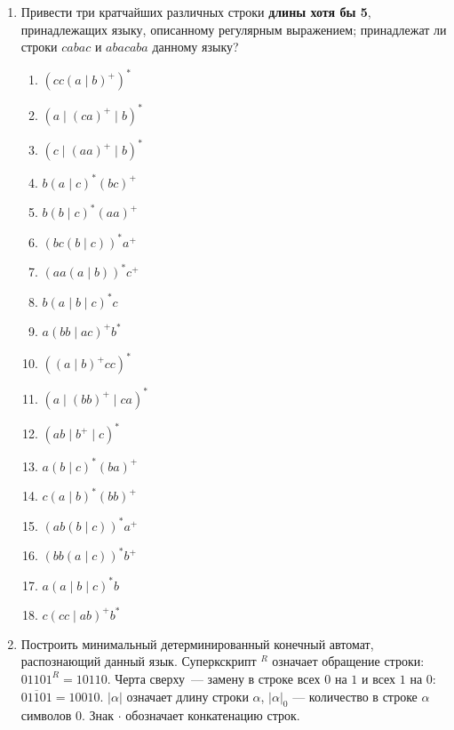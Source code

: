 \documentclass[12pt]{article}
\begin{document}
\newpage

\begin{enumerate}
\setlength\itemsep{1em}

  \item Привести три кратчайших различных строки \textbf{длины хотя бы 5}, принадлежащих языку, описанному регулярным выражением; принадлежат ли строки $cabac$ и $abacaba$ данному языку?

  \begin{enumerate}[label=\arabic*)]
    \setlength\itemsep{0.8em}
    \setcounter{enumii}{3}
    \item $(c c (a \mid b)^+)^*$
    \item $(a \mid (ca)^+ \mid b)^*$
    \item $(c \mid (aa)^+ \mid b)^*$
    \item $b (a \mid c)^* (bc)^+$
    \item $b (b \mid c)^* (aa)^+$
    \item $(bc (b \mid c))^* a^+$
    \item $(aa (a \mid b))^* c^+$
    \item $b (a \mid b \mid c)^* c$
    \item $a (bb \mid ac)^+ b^*$
    \item $((a \mid b)^+ c c)^*$
    \item $(a \mid (bb)^+ \mid ca)^*$
    \item $(ab \mid b^+ \mid c)^*$
    \item $a (b \mid c)^* (ba)^+$
    \item $c (a \mid b)^* (bb)^+$
    \item $(ab (b \mid c))^* a^+$
    \item $(bb (a \mid c))^* b^+$
    \item $a (a \mid b \mid c)^* b$
    \item $c (cc \mid ab)^+ b^*$
  \end{enumerate}

  \item Построить минимальный детерминированный конечный автомат, распознающий данный язык. Суперкскрипт $^R$ означает обращение строки: $01101^R = 10110$. Черта сверху~--- замену в строке всех $0$ на $1$ и всех $1$ на $0$: $\overline{01101} = 10010$. $|\alpha|$ означает длину строки $\alpha$, $|\alpha|_0$ --- количество в строке $\alpha$ символов $0$. Знак $\cdot$ обозначает конкатенацию строк.


\end{enumerate}
\end{document}

